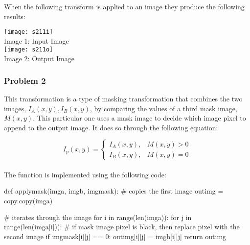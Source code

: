 \documentclass{article}
\begin{document}
	When the following transform is applied to an image they produce the following results: \newline
	
	\begin{center}
		\noindent \texttt{[image: s211i]}\\
		Image 1: Input Image\\
		
		\texttt{[image: s211o]}\\
		Image 2: Output Image\\
	\end{center}
	
	\subsubsection{Problem 2}
	
	This transformation is a type of masking transformation that combines the two images, $ I_{A}(x,y), I_{B}(x,y)$, by comparing the values of a third mask image, $ M(x,y) $. This particular one uses a mask image to decide which image pixel to append to the output image. It does so through the following equation: \newline
	
	
	\begin{equation}
	I_{p}(x,y) = \begin{cases} 
	I_{A}(x,y), & M(x,y) > 0\\
	I_{B}(x,y), & M(x,y) = 0
	\end{cases} 
	\end{equation}
	\\
	
	\noindent The function is implemented using the following code: \newline
	
	\noindent def apply\textunderscore mask(img\textunderscore a, img\textunderscore b, img\textunderscore mask): \newline
	\newline
	\indent \# copies the first image \newline
	\indent \indent out\textunderscore img = copy.copy(img\textunderscore a) \newline
	
	\indent \# iterates through the image \newline
	\indent for i in range(len(img\textunderscore a)): \newline
	\indent \indent for j in range(len(img\textunderscore a[i])): \newline
	\newline
	\indent \indent \indent\# if mask image pixel is black, then replace pixel with the second image \newline
	\indent \indent \indent if img\textunderscore mask[i][j] == 0: \newline
	\newline
	\indent \indent \indent \indent out\textunderscore img[i][j] = img\textunderscore b[i][j] \newline
	\newline
	\indent return out\textunderscore img \newline
	
\end{document}
